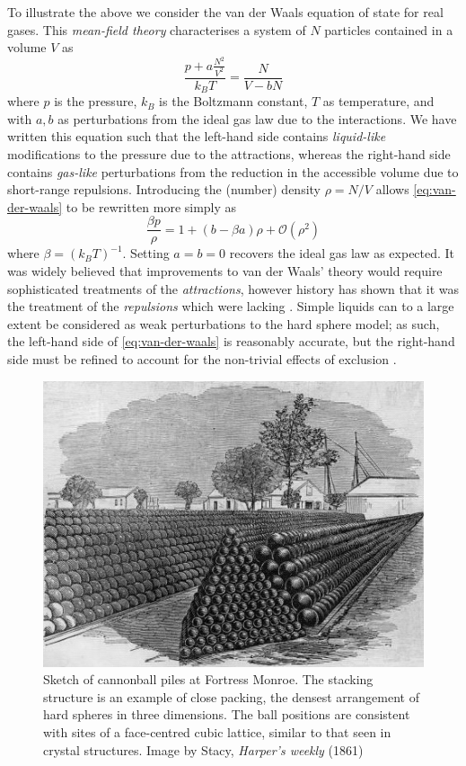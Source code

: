 \documentclass[11pt,twoside]{report}
\begin{document}
To illustrate the above we consider the van der Waals equation of state for real gases.
This \emph{mean-field theory} characterises a system of $N$ particles contained in a volume $V$ as
\begin{equation}\label{eq:van-der-waals}
  \frac{p + a \frac{N^2}{V^2}}{k_B T} = \frac{N}{V - b N}
\end{equation}
where $p$ is the pressure, $k_B$ is the Boltzmann constant, $T$ as temperature, and with $a,b$ as perturbations from the ideal gas law due to the interactions.
We have written this equation such that the left-hand side contains \emph{liquid-like} modifications to the pressure due to the attractions, whereas the right-hand side contains \emph{gas-like} perturbations from the reduction in the accessible volume due to short-range repulsions.
Introducing the (number) density $\rho = N/V$ allows \eqref{eq:van-der-waals} to be rewritten more simply as
\begin{equation}\label{eq:van-der-waals-2}
  \frac{\beta p}{\rho} = 1 + (b - \beta a) \rho + \mathcal{O}(\rho^2)
\end{equation}
where $\beta = (k_B T)^{-1}$.
Setting $a = b = 0$ recovers the ideal gas law as expected.
It was widely believed that improvements to van der Waals' theory would require sophisticated treatments of the \emph{attractions}, however history has shown that it was the treatment of the \emph{repulsions} which were lacking \cite{WidomS1967,Hansen2013,Santos2016}.
Simple liquids can to a large extent be considered as weak perturbations to the hard sphere model; as such, the left-hand side of \eqref{eq:van-der-waals} is reasonably accurate, but the right-hand side must be refined to account for the non-trivial effects of exclusion \cite{Hansen2013}.


\begin{figure}
  \includegraphics[width=0.75\linewidth,outer]{cannonballs}
  \caption[Close packed cannonballs]{
    Sketch of cannonball piles at Fortress Monroe.
    The stacking structure is an example of close packing, the densest arrangement of hard spheres in three dimensions.
    The ball positions are consistent with sites of a face-centred cubic lattice, similar to that seen in crystal structures.
    Image by Stacy, \emph{Harper's weekly} (1861)}
  \label{fig:fcc}
\end{figure}
\end{document}
